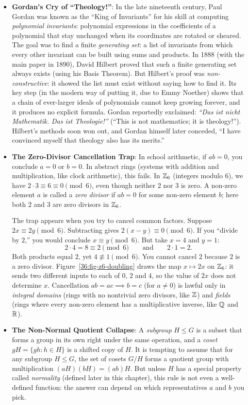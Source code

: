 \begin{itemize}
  \item \textbf{Gordan's Cry of ``Theology!''}: In the late nineteenth century, Paul Gordan was known as the ``King of Invariants'' for his skill at computing \emph{polynomial invariants}: polynomial expressions in the coefficients of a polynomial that stay unchanged when its coordinates are rotated or sheared. The goal was to find a finite \emph{generating set}: a list of invariants from which every other invariant can be built using sums and products. In 1888 (with the main paper in 1890), David Hilbert proved that such a finite generating set always exists (using his Basis Theorem). But Hilbert's proof was \emph{non-constructive}: it showed the list must exist without saying how to find it. Its key step (in the modern way of putting it, due to Emmy Noether) shows that a chain of ever-larger ideals of polynomials cannot keep growing forever, and it produces no explicit formula. Gordan reportedly exclaimed: \emph{``Das ist nicht Mathematik. Das ist Theologie!''} (``This is not mathematics; it is theology!''). Hilbert's methods soon won out, and Gordan himself later conceded, ``I have convinced myself that theology also has its merits.''
  \item \textbf{The Zero-Divisor Cancellation Trap}: In school arithmetic, if $ab = 0$, you conclude $a = 0$ or $b = 0$. In abstract rings (systems with addition and multiplication, like clock arithmetic), this fails. In $\mathbb{Z}_6$ (integers modulo 6), we have $2 \cdot 3 \equiv 6 \equiv 0 \pmod 6$, even though neither $2$ nor $3$ is zero. A non-zero element $a$ is called a \emph{zero divisor} if $ab = 0$ for some non-zero element $b$; here both $2$ and $3$ are zero divisors in $\mathbb{Z}_6$.

  The trap appears when you try to cancel common factors. Suppose $2x \equiv 2y \pmod 6$. Subtracting gives $2(x - y) \equiv 0 \pmod 6$. If you ``divide by $2$,'' you would conclude $x \equiv y \pmod 6$. But take $x = 4$ and $y = 1$:
  \[
  2 \cdot 4 = 8 \equiv 2 \pmod 6 \qquad \text{and} \qquad 2 \cdot 1 = 2.
  \]
  Both products equal $2$, yet $4 \not\equiv 1 \pmod 6$. You cannot cancel $2$ because $2$ is a zero divisor. Figure~\ref{36:fig-z6-doubling} draws the map $x \mapsto 2x$ on $\mathbb{Z}_6$: it sends two different inputs to each of $0$, $2$ and $4$, so the value of $2x$ does not determine $x$. Cancellation $ab = ac \implies b = c$ (for $a \neq 0$) is lawful only in \emph{integral domains} (rings with no nontrivial zero divisors, like $\mathbb{Z}$) and \emph{fields} (rings where every non-zero element has a multiplicative inverse, like $\mathbb{Q}$ and $\mathbb{R}$).
  \item \textbf{The Non-Normal Quotient Collapse}: A \emph{subgroup} $H \le G$ is a subset that forms a group in its own right under the same operation, and a \emph{coset} $gH = \{gh : h \in H\}$ is a shifted copy of $H$. It is tempting to assume that for any subgroup $H \le G$, the set of cosets $G/H$ forms a quotient group with multiplication $(aH)(bH) = (ab)H$. But unless $H$ has a special property called \emph{normality} (defined later in this chapter), this rule is not even a well-defined function: the answer can depend on which representatives $a$ and $b$ you pick.


\end{itemize}
